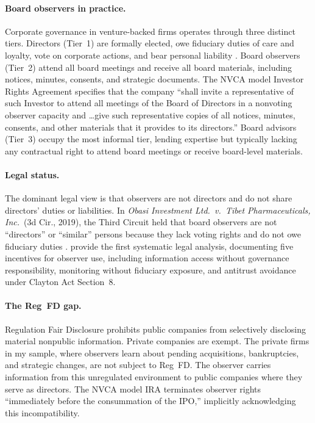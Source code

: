 \documentclass[12pt]{article}
\begin{document}
\paragraph{Board observers in practice.} Corporate governance in venture-backed firms operates through three distinct tiers. Directors (Tier~1) are formally elected, owe fiduciary duties of care and loyalty, vote on corporate actions, and bear personal liability \cite{ewens2024board}. Board observers (Tier~2) attend all board meetings and receive all board materials, including notices, minutes, consents, and strategic documents. The NVCA model Investor Rights Agreement specifies that the company ``shall invite a representative of such Investor to attend all meetings of the Board of Directors in a nonvoting observer capacity and \ldots give such representative copies of all notices, minutes, consents, and other materials that it provides to its directors.'' Board advisors (Tier~3) occupy the most informal tier, lending expertise but typically lacking any contractual right to attend board meetings or receive board-level materials.

\paragraph{Legal status.} The dominant legal view is that observers are not directors and do not share directors' duties or liabilities. In \textit{Obasi Investment Ltd.\ v.\ Tibet Pharmaceuticals, Inc.}\ (3d Cir., 2019), the Third Circuit held that board observers are not ``directors'' or ``similar'' persons because they lack voting rights and do not owe fiduciary duties \cite{packin2025board}.  provide the first systematic legal analysis, documenting five incentives for observer use, including information access without governance responsibility, monitoring without fiduciary exposure, and antitrust avoidance under Clayton Act Section~8.

\paragraph{The Reg~FD gap.} Regulation Fair Disclosure prohibits public companies from selectively disclosing material nonpublic information. Private companies are exempt. The private firms in my sample, where observers learn about pending acquisitions, bankruptcies, and strategic changes, are not subject to Reg~FD. The observer carries information from this unregulated environment to public companies where they serve as directors. The NVCA model IRA terminates observer rights ``immediately before the consummation of the IPO,'' implicitly acknowledging this incompatibility.
\end{document}
